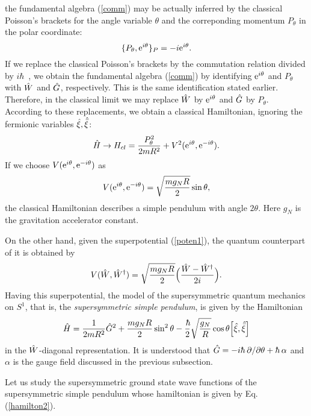\documentclass[a4paper,12pt]{article}
\begin{document}
the fundamental algebra (\ref{comm}) may be actually inferred 
by the classical Poisson's brackets for the angle variable $\theta$ and
the correponding momentum $P_{\theta}$ in the polar coordinate:
\begin{equation}
\{P_{\theta}, {\rm e}^{i\theta}\}_P=-i {\rm e}^{i\theta}.
\end{equation}
If we replace the 
classical Poisson's brackets by the commutation relation 
divided by $i\hbar$~, we obtain
the fundamental algebra (\ref{comm}) by identifying ${\rm e}^{i\theta}$ 
and $P_{\theta}$ 
with $\hat W$ and $\hat G$, respectively. This is the same identification
stated earlier. Therefore, in the classical limit we may replace
$\hat W$ by ${\rm e}^{i\theta}$ and $\hat G$ by $P_{\theta}$.
According to these replacements, we obtain a classical 
Hamiltonian, ignoring the fermionic variables $\hat\xi, \hat{\bar\xi}$:
\begin{equation}
\hat H\rightarrow H_{cl}={P_{\theta}^2\over {2mR^2}}+
V^2({\rm e}^{i\theta},{\rm e}^{-i\theta}).
\end{equation}
If we choose $V({\rm e}^{i\theta},{\rm e}^{-i\theta})$ as
\begin{equation}
V({\rm e}^{i\theta},{\rm e}^{-i\theta})=\sqrt{{{mg_NR}\over 2}}\sin\theta,
\label{poten1}
\end{equation}
the classical Hamiltonian describes a simple pendulum with angle 
$2\theta$. Here $g_N$ is the gravitation accelerator constant.
\par
On the other hand, given the superpotential (\ref{poten1}), the quantum
counterpart of it is obtained by 
\begin{equation}  
V(\hat W,{\hat W}^{\dagger})=\sqrt{{mg_NR}\over {2}}\Bigl({{\hat W-{\hat W}^{\dagger}}\over {2i}}\Bigr).
\end{equation}
Having this superpotential, the model of the supersymmetric quantum
mechanics on $S^1$, that is, the {\it supersymmetric simple pendulum}, is 
given by the Hamiltonian
\begin{equation}
\hat H= {1\over {2mR^2}}\hg^2+{{mg_NR}\over 2}\sin^2\theta 
-{\hbar\over 2}\sqrt{{g_N\over R}}\cos\theta\Bigl[\hxi, \hxib\Bigr]
\label{hamilton2} 
\end{equation}
in the $\hat W$-diagonal representation. 
It is understood that $\hg=-i\hbar~\del/\del\theta+\hbar~\alpha$ and 
$\alpha$ is the gauge field discussed in the previous subsection.
\par
Let us study the supersymmetric ground state wave functions of 
the supersymmetric simple pendulum whose hamiltonian 
is given by Eq. (\ref{hamilton2}). 
\end{document}
